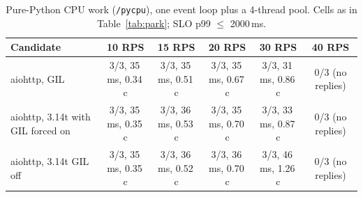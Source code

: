\begin{table}[t]
\caption{Pure-Python CPU work (\texttt{/pycpu}), one event loop plus a 4-thread pool. Cells as in Table~\ref{tab:park}; SLO p99 $\le$ 2000\,ms.}
\label{tab:gil}
\centering\small
\begin{tabular}{lccccc}
\toprule
Candidate & 10 RPS & 15 RPS & 20 RPS & 30 RPS & 40 RPS \\
\midrule
aiohttp, GIL & 3/3, 35\,ms, 0.34\,c & 3/3, 35\,ms, 0.51\,c & 3/3, 35\,ms, 0.67\,c & 3/3, 31\,ms, 0.86\,c & 0/3 (no replies) \\
aiohttp, 3.14t with GIL forced on & 3/3, 35\,ms, 0.35\,c & 3/3, 36\,ms, 0.53\,c & 3/3, 35\,ms, 0.70\,c & 3/3, 33\,ms, 0.87\,c & 0/3 (no replies) \\
aiohttp, 3.14t GIL off & 3/3, 35\,ms, 0.35\,c & 3/3, 36\,ms, 0.52\,c & 3/3, 36\,ms, 0.70\,c & 3/3, 46\,ms, 1.26\,c & 0/3 (no replies) \\
\bottomrule
\end{tabular}
\end{table}
